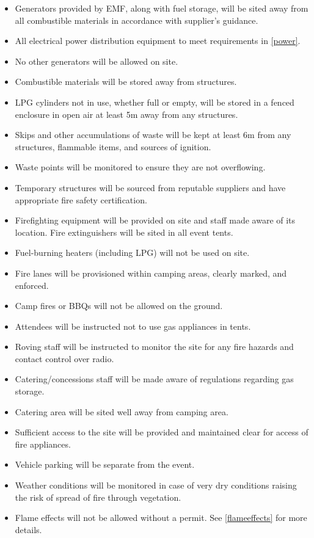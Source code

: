 \begin{itemize}
\tightlist
\item Generators provided by EMF, along with fuel storage, will be sited away from all
      combustible materials in accordance with supplier's guidance.
\item All electrical power distribution equipment to meet requirements in \cref{power}.
\item No other generators will be allowed on site.
\item Combustible materials will be stored away from structures.
\item LPG cylinders not in use, whether full or empty, will be stored in a fenced enclosure in open air at least 5m
      away from any structures.
\item Skips and other accumulations of waste will be kept at least 6m from any structures, flammable items, and sources of ignition.
\item Waste points will be monitored to ensure they are not overflowing.
\item Temporary structures will be sourced from reputable suppliers and have appropriate fire safety certification.
\item Firefighting equipment will be provided on site and staff made aware of its location. Fire extinguishers will be sited
      in all event tents.
\item Fuel-burning heaters (including LPG) will not be used on site.
\item Fire lanes will be provisioned within camping areas, clearly marked, and enforced.
\item Camp fires or BBQs will not be allowed on the ground.
\item Attendees will be instructed not to use gas appliances in tents.
\item Roving staff will be instructed to monitor the site for any fire hazards and contact control over radio.
\item Catering/concessions staff will be made aware of regulations regarding gas storage.
\item Catering area will be sited well away from camping area.
\item Sufficient access to the site will be provided and maintained clear for access of fire appliances.
\item Vehicle parking will be separate from the event.
\item Weather conditions will be monitored in case of very dry conditions raising the risk of spread of fire through vegetation.
\item Flame effects will not be allowed without a permit. See \cref{flameeffects} for more details.
\end{itemize}

